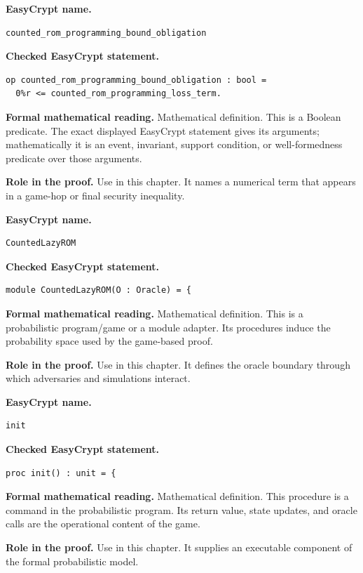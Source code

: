 \begin{formaldefinition}
\noindent\textbf{EasyCrypt name.}
\begin{lstlisting}[language=EasyCrypt,basicstyle=\ttfamily\scriptsize]
counted_rom_programming_bound_obligation
\end{lstlisting}
\noindent\textbf{Checked EasyCrypt statement.}
\begin{lstlisting}[language=EasyCrypt,basicstyle=\ttfamily\scriptsize]
op counted_rom_programming_bound_obligation : bool =
  0%r <= counted_rom_programming_loss_term.
\end{lstlisting}
\noindent\textbf{Formal mathematical reading.}
Mathematical definition. This is a Boolean predicate.  The exact displayed EasyCrypt statement gives its arguments; mathematically it is an event, invariant, support condition, or well-formedness predicate over those arguments.

\noindent\textbf{Role in the proof.}
Use in this chapter. It names a numerical term that appears in a game-hop or final security inequality.

\end{formaldefinition}

\begin{formaldefinition}
\noindent\textbf{EasyCrypt name.}
\begin{lstlisting}[language=EasyCrypt,basicstyle=\ttfamily\scriptsize]
CountedLazyROM
\end{lstlisting}
\noindent\textbf{Checked EasyCrypt statement.}
\begin{lstlisting}[language=EasyCrypt,basicstyle=\ttfamily\scriptsize]
module CountedLazyROM(O : Oracle) = {
\end{lstlisting}
\noindent\textbf{Formal mathematical reading.}
Mathematical definition. This is a probabilistic program/game or a module adapter.  Its procedures induce the probability space used by the game-based proof.

\noindent\textbf{Role in the proof.}
Use in this chapter. It defines the oracle boundary through which adversaries and simulations interact.

\end{formaldefinition}

\begin{formaldefinition}
\noindent\textbf{EasyCrypt name.}
\begin{lstlisting}[language=EasyCrypt,basicstyle=\ttfamily\scriptsize]
init
\end{lstlisting}
\noindent\textbf{Checked EasyCrypt statement.}
\begin{lstlisting}[language=EasyCrypt,basicstyle=\ttfamily\scriptsize]
proc init() : unit = {
\end{lstlisting}
\noindent\textbf{Formal mathematical reading.}
Mathematical definition. This procedure is a command in the probabilistic program.  Its return value, state updates, and oracle calls are the operational content of the game.

\noindent\textbf{Role in the proof.}
Use in this chapter. It supplies an executable component of the formal probabilistic model.

\end{formaldefinition}

